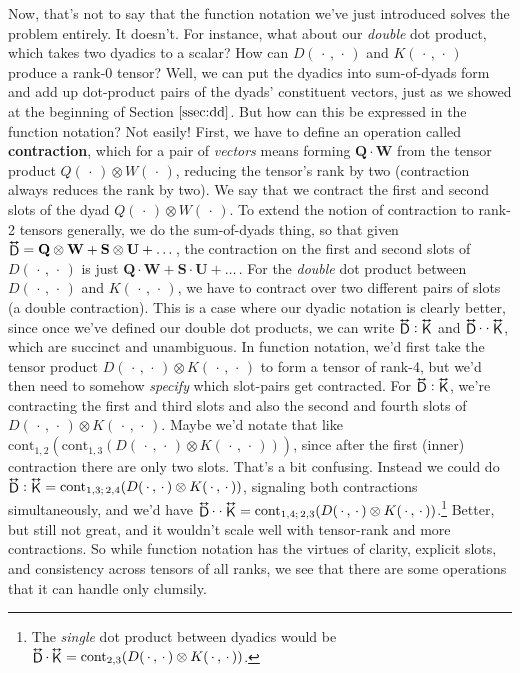 \documentclass[12pt]{article}
\renewcommand{\vv}[1]{\mathbf{#1}}
\newcommand{\tightoverset}[2]{%
  \mathop{#2}\limits^{\vbox to -.5ex{\kern-0.75ex\hbox{$#1$}\vss}}}
\newcommand{\inlinedy}[1]{\tightoverset{\text{\tiny$\bm\leftrightarrow$}}{#1}}
\begin{document}
Now, that's not to say that the function notation we've just introduced solves the problem entirely. It doesn't. For instance, what about our \emph{double} dot product, which takes two dyadics to a scalar? How can $D(\, \cdot \, , \, \cdot \,)$ and $K(\, \cdot \, , \, \cdot \,)$ produce a rank-0 tensor? Well, we can put the dyadics into sum-of-dyads form and add up dot-product pairs of the dyads' constituent vectors, just as we showed at the beginning of Section $\ref{ssec:dd}$. But how can this be expressed in the function notation? Not easily! First, we have to define an operation called \textbf{contraction}, which for a pair of \emph{vectors} means forming $\vv Q \cdot \vv W$ from the tensor product $Q(\, \cdot \, ) \otimes W(\, \cdot \, )$, reducing the tensor's rank by two (contraction always reduces the rank by two). We say that we contract the first and second slots of the dyad $Q(\, \cdot \, ) \otimes W(\, \cdot \, )$. To extend the notion of contraction to rank-2 tensors generally, we do the sum-of-dyads thing, so that given $\inlinedy{\mathsf{D}} = \vv Q \otimes \vv W + \vv S \otimes \vv U + \ldots \,$, the contraction on the first and second slots of $D(\, \cdot \, , \, \cdot \,)$ is just $\vv Q \cdot \vv W + \vv S \cdot \vv U + \ldots \,$. For the \emph{double} dot product between $D(\, \cdot \, , \, \cdot \,)$ and $K(\, \cdot \, , \, \cdot \,)$, we have to contract over two different pairs of slots (a double contraction). This is a case where our dyadic notation is clearly better, since once we've defined our double dot products, we can write $\inlinedy{\mathsf{D}} : \inlinedy{\mathsf{K}}$ and $\inlinedy{\mathsf{D}} \cdot \cdot \inlinedy{\mathsf{K}}$, which are succinct and unambiguous. In function notation, we'd first take the tensor product $D(\, \cdot \, , \, \cdot \,) \otimes K(\, \cdot \, , \, \cdot \,)$ to form a tensor of rank-4, but we'd then need to somehow \emph{specify} which slot-pairs get contracted. For $\inlinedy{\mathsf{D}} : \inlinedy{\mathsf{K}}$, we're contracting the first and third slots and also the second and fourth slots of  $D(\, \cdot \, , \, \cdot \,) \otimes K(\, \cdot \, , \, \cdot \,)$. Maybe we'd notate that like ${\textrm{cont}_{1,2}(\textrm{cont}_{1,3}(D(\, \cdot \, , \, \cdot \,) \otimes K(\, \cdot \, , \, \cdot \,)))}$, since after the first (inner) contraction there are only two slots. That's a bit confusing. Instead we could do  ${\inlinedy{\mathsf{D}} : \inlinedy{\mathsf{K}} = \textrm{cont}_{1,3; \, 2,4}(D(\, \cdot \, , \, \cdot \,) \otimes K(\, \cdot \, , \, \cdot \,))}$, signaling both contractions simultaneously, and we'd have $\inlinedy{\mathsf{D}} \cdot \cdot \inlinedy{\mathsf{K}} = \textrm{cont}_{1,4; \, 2,3}(D(\, \cdot \, , \, \cdot \,) \otimes K(\, \cdot \, , \, \cdot \,))$.\footnote{The \emph{single} dot product between dyadics would be $\inlinedy{\mathsf{D}} \cdot \inlinedy{\mathsf{K}} = \textrm{cont}_{2,3}(D(\, \cdot \, , \, \cdot \,) \otimes K(\, \cdot \, , \, \cdot \,))$.} Better, but still not great, and it wouldn't scale well with tensor-rank and more contractions. So while function notation has the virtues of clarity, explicit slots, and consistency across tensors of all ranks, we see that there are some operations that it can handle only clumsily.
\end{document}
